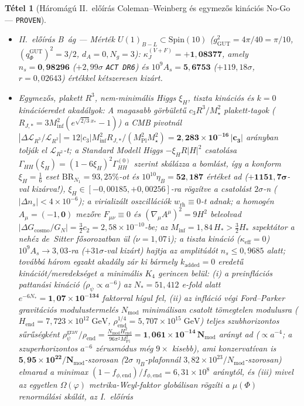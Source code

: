\documentclass[11pt,a4paper]{article}
\newtheorem{theorem}{Tétel}
\begin{document}
\begin{theorem}[Háromágú II.~előírás Coleman--Weinberg és egymezős kinációs No-Go --- \textnormal{{\upshape\texttt{PROVEN}}}]
\begin{enumerate}
\begin{itemize}
    \item \emph{II.~előírás B~ág — Mérték $U(1)_{B-L} \subset \mathrm{Spin}(10)$ ($g_{\mathrm{GUT}}^2 = 4\pi/40 = \pi/10$, $(q_\Phi^{\mathrm{GUT}})^2 = 3/2$, $d_A = 0, N_g = 3$):} $\kappa_J^{(V+F)} = \mathbf{+1{,}08377}$, amely $n_s = \mathbf{0{,}98296}$ ($+2{,}99\sigma$ {\upshape\texttt{ACT DR6}}) és $10^9 A_s = \mathbf{5{,}6753}$ ($+119{,}18\sigma$, $r = 0{,}02643$) értékkel kétszeresen kizárt.
    \item \emph{Egymezős, plakett $R^3$, nem-minimális Higgs $\xi_H$, tiszta kinációs és $k=0$ kinációeredet akadályok:} A magasabb görbületű $c_3 R^3/M_\star^2$ plakett-tagok ($R_{J,*} = 3M_{\mathrm{inf}}^2(e^{\sqrt{2/3}\,x_*} - 1)$) a CMB pivotnál $|\Delta\mathcal{L}_{R^3}/\mathcal{L}_{R^2}| = 12|c_3|M_{\mathrm{inf}}^2 R_{J,*}/\allowbreak(M_{\mathrm{Pl}}^2 M_\star^2) = \mathbf{2{,}283\times 10^{-16}\,|c_3|}$ arányban tolják el $\mathcal{L}_{R^2}$-t; a Standard Modell Higgs $-\xi_H R|H|^2$ csatolása $\Gamma_{HH}(\xi_H) = (1 - 6\xi_H)^2\Gamma_{HH}^{(0)}$ szerint skálázza a bomlást, így a konform $\xi_H = \frac{1}{6}$ eset $\mathrm{BR}_{N_1} = 93{,}25\%$-ot és $10^{10}\eta_B = \mathbf{52{,}187}$ értéket ad ($\mathbf{+1151{,}7\sigma}$-val kizárva!), $\xi_H \in [-0{,}00185, +0{,}00256]$-ra rögzítve a csatolást $2\sigma$-n ($|\Delta n_s| < 4\times 10^{-6}$); a virializált oszcillációk $w_{\mathrm{rh}} \equiv 0$-t adnak; a homogén $A_\mu = (-1,\mathbf{0})$ mezőre $F_{\mu\nu} \equiv 0$ és $(\nabla_\mu A^\mu)^2 = 9H^2$ beleolvad $|\Delta G_{\mathrm{cosmo}}/G_N| = \frac{3}{2}c_2 = 2{,}58\times 10^{-10}$-be; az $M_{\mathrm{inf}} = 1{,}84\,H_* > \frac{3}{2}H_*$ szpektátor a nehéz de~Sitter fősorozatban ül ($\nu = 1{,}07\,\mathrm{i}$); a tiszta kináció ($\kappa_{\mathrm{eff}} = 0$) $10^9 A_s \to 3{,}03$-ra ($+31\sigma$-val kizárt) hajtja az amplitúdót $n_s \le 0{,}9685$ alatt; továbbá három egzakt akadály zár ki bármely $k_{\mathrm{added}} = 0$ eredetű kinációt/meredekséget a minimális $K_4$ gerincen belül: (i) a preinflációs pattanási kináció ($\rho_\psi \propto a^{-6}$) az $N_* = 51{,}412$ e-fold alatt $e^{-6N_*} = \mathbf{1{,}07\times 10^{-134}}$ faktorral hígul fel, (ii) az infláció végi Ford--Parker gravitációs modulustermelés \cite{Ford1987} $N_{\mathrm{mod}}$ minimálisan csatolt tömegtelen modulusra ($H_{\mathrm{end}} = 7{,}723\times 10^{12}\;\mathrm{GeV}$, $\rho_{\mathrm{end}}^{1/4} = 5{,}707\times 10^{15}\;\mathrm{GeV}$) teljes szubhorizontos sűrűségként $\rho_\psi^{\mathrm{grav}}/\rho_{\mathrm{end}} = \frac{N_{\mathrm{mod}}H_{\mathrm{end}}^2}{96\pi^2 M_{\mathrm{Pl}}^2} = \mathbf{1{,}061\times 10^{-14}\,N_{\mathrm{mod}}}$ arányt ad ($\propto a^{-4}$; a szuperhorizontos $a^{-6}$ zérusmódus még $9\times$ kisebb), ami konzervatívan is $\mathbf{5{,}95\times 10^{22}/N_{\mathrm{mod}}}$-szorosan ($2\sigma$ $\eta_B$-plafonnál $3{,}82\times 10^{23}/N_{\mathrm{mod}}$-szorosan) elmarad a minimax $(1-f_{\phi,\mathrm{end}})/f_{\phi,\mathrm{end}} = 6{,}31\times 10^8$ aránytól, és (iii) mivel az egyetlen $\Omega(\varphi)$ metrika-Weyl-faktor globálisan rögzíti a $\mu(\Phi)$ renormálási skálát, az I.~előírás 
\end{itemize}
\end{enumerate}
\end{theorem}
\end{document}
